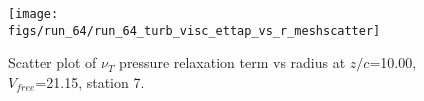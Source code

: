 \begin{figure}[H]
\centering
\texttt{[image: figs/run\_64/run\_64\_turb\_visc\_ettap\_vs\_r\_meshscatter]}
\caption{Scatter plot of $\nu_T$ pressure relaxation term vs radius at $z/c$=10.00, $V_{free}$=21.15, station 7.}
\label{fig:run_64_turb_visc_ettap_vs_r_meshscatter}
\end{figure}


